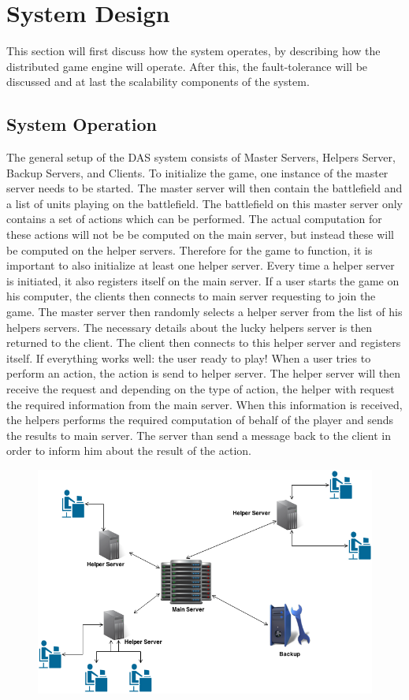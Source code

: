 \section{System Design}
This section will first discuss how the system operates, by describing how the distributed game engine will operate.
After this, the fault-tolerance will be discussed and at last the scalability components of the system.

\subsection{System Operation}
The general setup of the DAS system consists of Master Servers, Helpers Server, Backup Servers, and Clients.
To initialize the game, one instance of the master server needs to be started. 
The master server will then contain the battlefield and a list of units playing on the battlefield.
The battlefield on this master server only contains a set of actions which can be performed.
The actual computation for these actions will not be be computed on the main server, but instead these will be computed on the helper servers.
Therefore for the game to function, it is important to also initialize at least one helper server. 
Every time a helper server is initiated, it also registers itself on the main server.
If a user starts the game on his computer, the clients then connects to main server requesting to join the game.
The master server then randomly selects a helper server from the list of his helpers servers.
The necessary details about the lucky helpers server is then returned to the client. 
The client then connects to this helper server and registers itself.
If everything works well: the user ready to play!
When a user tries to perform an action, the action is send to helper server.
The helper server will then receive the request and depending on the type of action, the helper with request the required information from the main server.
When this information is received, the helpers performs the required computation of behalf of the player and sends the results to main server.
The server than send a message back to the client in order to inform him about the result of the action.

\begin{figure}[H]
\includegraphics[scale=0.5]{DCS.png}
\end{figure}

